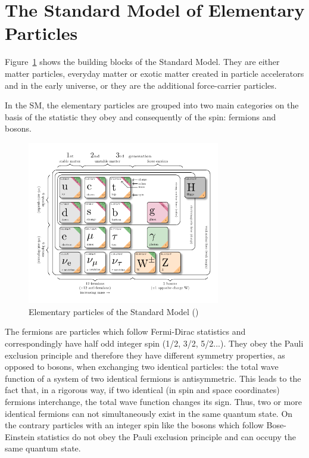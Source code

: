 \section{The Standard Model of Elementary Particles}\label{sec:sm}
Figure~\ref{fig:SMfig} shows the building blocks of the Standard Model. They are either matter particles, everyday matter
or exotic matter created in particle accelerators and in the early universe, or they are the additional force-carrier particles.

In the SM, the elementary particles are grouped into two main categories on the basis of the statistic they obey and consequently of the spin: fermions and bosons. 
\begin{figure}[h]
\centering
\includegraphics[width=0.75\textwidth]{Figures/c1/SM_infographic.pdf}
\caption{Elementary particles of the Standard Model (\willem)}
\label{fig:SMfig}
\end{figure}

The fermions are particles which follow Fermi-Dirac statistics and correspondingly have half odd integer spin (1/2, 3/2, 5/2...). They obey the Pauli exclusion principle and therefore they have different symmetry properties, as opposed to bosons, when exchanging two identical particles: the total wave function of a system of two identical fermions is antisymmetric. This leads to the fact that, in a rigorous way, if two identical (in spin and space coordinates) fermions interchange, the total wave function changes its sign. Thus, two or more identical fermions can not simultaneously exist in the same quantum state. On the contrary particles with an integer spin like the bosons which follow Bose-Einstein statistics do not obey the Pauli exclusion principle and can occupy the same quantum state. 


